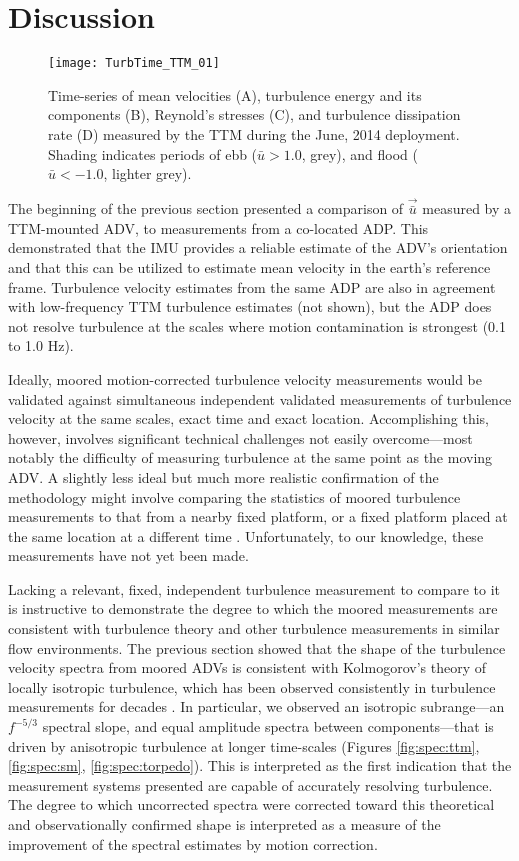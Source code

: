 
\section{Discussion}

\begin{figure*}[t]
  \centering
  \texttt{[image: TurbTime\_TTM\_01]}
  \caption{Time-series of mean velocities (A), turbulence energy and its components (B), Reynold's stresses (C), and turbulence dissipation rate (D) measured by the TTM during the June, 2014 deployment. Shading indicates periods of ebb ($\bar{u}>1.0$, grey), and flood ($\bar{u}<-1.0$, lighter grey).}
  \label{fig:turbtime:ttm}
\end{figure*}

The beginning of the previous section presented a comparison of $\vec{\bar{u}}$ measured by a TTM-mounted ADV, to measurements from a co-located ADP. This demonstrated that the IMU provides a reliable estimate of the ADV's orientation and that this can be utilized to estimate mean velocity in the earth's reference frame. Turbulence velocity estimates from the same ADP are also in agreement with low-frequency TTM turbulence estimates (not shown), but the ADP does not resolve turbulence at the scales where motion contamination is strongest (0.1 to 1.0 Hz).

Ideally, moored motion-corrected turbulence velocity measurements would be validated against simultaneous independent validated measurements of turbulence velocity at the same scales, exact time and exact location. Accomplishing this, however, involves significant technical challenges not easily overcome---most notably the difficulty of measuring turbulence at the same point as the moving ADV. A slightly less ideal but much more realistic confirmation of the methodology might involve comparing the statistics of moored turbulence measurements to that from a nearby fixed platform, or a fixed platform placed at the same location at a different time \citep[e.g. the `TTT' platform described in][]{Thomson++2012}. Unfortunately, to our knowledge, these measurements have not yet been made.

Lacking a relevant, fixed, independent turbulence measurement to compare to it is instructive to demonstrate the degree to which the moored measurements are consistent with turbulence theory and other turbulence measurements in similar flow environments. The previous section showed that the shape of the turbulence velocity spectra from moored ADVs is consistent with Kolmogorov's theory of locally isotropic turbulence, which has been observed consistently in turbulence measurements for decades \citep[]{Kolmogorov1941c,Grant++1962,McMillan++2016}. In particular, we observed an isotropic subrange---an $f^{-5/3}$ spectral slope, and equal amplitude spectra between components---that is driven by anisotropic turbulence at longer time-scales (Figures \ref{fig:spec:ttm}, \ref{fig:spec:sm}, \ref{fig:spec:torpedo}). This is interpreted as the first indication that the measurement systems presented are capable of accurately resolving turbulence. The degree to which uncorrected spectra were corrected toward this theoretical and observationally confirmed shape is interpreted as a measure of the improvement of the spectral estimates by motion correction.

